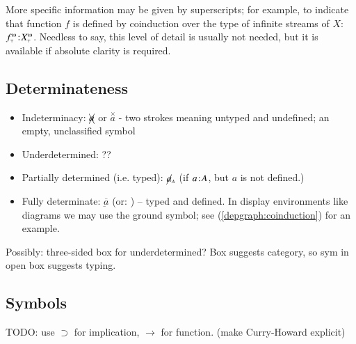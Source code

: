 More specific information may be given by superscripts; for example,
to indicate that function \(f\) is defined by coinduction over the
type of infinite streams of \(X\):
\(\tj{\defndn{f}^{\omegaup}}{\defndn{X}^{\omegaup}}\). Needless to
say, this level of detail is usually not needed, but it is available
if absolute clarity is required.

\subsection{Determinateness}

\begin{itemize}
\item Indeterminacy: \(\xcancel{a}\) or \(\overset{\times}{a}\) - two
  strokes meaning untyped and undefined; an empty, unclassified symbol
\item Underdetermined: ??
\item Partially determined (i.e. typed): \(\cancel{a}_{\scriptscriptstyle A}\) (if \(a\hspace{1pt}\mathpunct{:}\hspace{-1pt}A\), but \(a\) is not defined.)
\item Fully determinate: \(\overbar{\underbar{a}}\) (or: )
  -- typed and defined. In display environments like diagrams we may
  use the ground symbol; see (\ref{depgraph:coinduction}) for an
  example.
\end{itemize}

Possibly: three-sided box for underdetermined? Box suggests category,
so sym in open box suggests typing.

\subsection{Symbols}

TODO: use \(\supset\) for implication, \(\rightarrow\) for function.
(make Curry-Howard explicit)

